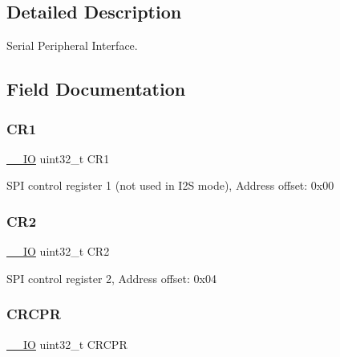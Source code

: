 \subsection{Detailed Description}
Serial Peripheral Interface. 

\subsection{Field Documentation}
\mbox{\label{struct_s_p_i___type_def_ab0ec7102960640751d44e92ddac994f0}} 
\subsubsection{\texorpdfstring{C\+R1}{CR1}}
{\footnotesize\ttfamily \mbox{\hyperlink{core__sc300_8h_aec43007d9998a0a0e01faede4133d6be}{\+\_\+\+\_\+\+IO}} uint32\+\_\+t C\+R1}

S\+PI control register 1 (not used in I2S mode), Address offset\+: 0x00 \mbox{\label{struct_s_p_i___type_def_afdfa307571967afb1d97943e982b6586}} 
\subsubsection{\texorpdfstring{C\+R2}{CR2}}
{\footnotesize\ttfamily \mbox{\hyperlink{core__sc300_8h_aec43007d9998a0a0e01faede4133d6be}{\+\_\+\+\_\+\+IO}} uint32\+\_\+t C\+R2}

S\+PI control register 2, Address offset\+: 0x04 \mbox{\label{struct_s_p_i___type_def_ace450027b4b33f921dd8edd3425a717c}} 
\subsubsection{\texorpdfstring{C\+R\+C\+PR}{CRCPR}}
{\footnotesize\ttfamily \mbox{\hyperlink{core__sc300_8h_aec43007d9998a0a0e01faede4133d6be}{\+\_\+\+\_\+\+IO}} uint32\+\_\+t C\+R\+C\+PR}

